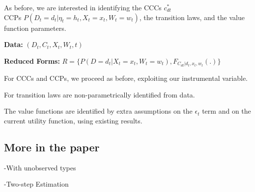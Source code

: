 \documentclass[
  letterpaper,
  DIV=11,
  numbers=noendperiod]{scrartcl}
\begin{document}
As before, we are interested in identifying the CCCs \(c^{*}_{dt}\)\\
CCPs \(P(D_t = d_t | \eta_{t} = h_{t}, X_t = x_t, W_t = w_t)\), the
transition laws, and the value function parameters.

\textbf{Data:} \((D_t,C_t,X_t,W_t,t)\)

\textbf{Reduced Forms:}
\(R = \{P(D=d_t|X_t=x_t,W_t=w_{t}), F_{C_{dt}|d_t,x_t,w_t}(.)\}\)

For CCCs and CCPs, we proceed as before, exploiting our instrumental
variable.

For transition laws are non-parametrically identified from data.

The value functions are identified by extra assumptions on the
\(\epsilon_t\) term and on the current utility function, using existing
results.

\subsection{More in the paper}\label{more-in-the-paper}

-With unobserved types

-Two-step Estimation
\end{document}
